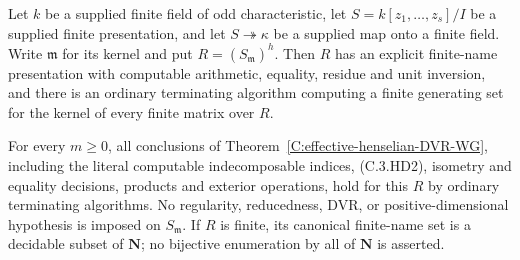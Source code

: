 \begin{theorem}
\label{C:finite-field-henselization-WG}
Let $k$ be a supplied finite field of odd characteristic,
let $S=k[z_1,\ldots,z_s]/I$ be a supplied finite
presentation, and let $S\twoheadrightarrow\kappa$ be
a supplied map onto a finite field.  Write
$\mathfrak m$ for its kernel and put $R=(S_{\mathfrak m})^h$.
Then $R$ has an explicit finite-name presentation with
computable arithmetic, equality, residue and unit
inversion, and there is an ordinary terminating
algorithm computing a finite generating set for the
kernel of every finite matrix over $R$.

For every $m\geq0$, all conclusions of
Theorem~\ref{C:effective-henselian-DVR-WG}, including
the literal computable indecomposable indices,
(C.3.HD2), isometry and equality decisions, products
and exterior operations, hold for this $R$ by ordinary
terminating algorithms.  No regularity, reducedness,
DVR, or positive-dimensional hypothesis is imposed
on $S_{\mathfrak m}$.  If $R$ is finite, its canonical
finite-name set is a decidable subset of $\mathbf N$;
no bijective enumeration by all of $\mathbf N$ is asserted.
\end{theorem}

